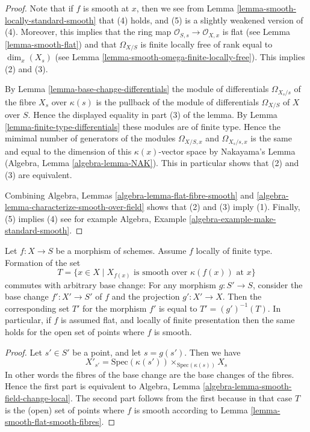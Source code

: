 \begin{proof}
Note that if $f$ is smooth at $x$, then we see from Lemma
\ref{lemma-smooth-locally-standard-smooth} that (4) holds, and (5) is a slightly
weakened version of (4). Moreover, this implies that the ring
map $\mathcal{O}_{S, s} \to \mathcal{O}_{X, x}$ is flat (see
Lemma \ref{lemma-smooth-flat}) and that $\Omega_{X/S}$ is
finite locally free of rank equal to
$\dim_x(X_s)$ (see Lemma \ref{lemma-smooth-omega-finite-locally-free}).
This implies (2) and (3).

\medskip\noindent
By Lemma \ref{lemma-base-change-differentials}
the module of differentials $\Omega_{X_s/s}$ of the fibre $X_s$
over $\kappa(s)$ is the pullback of the module of differentials
$\Omega_{X/S}$ of $X$ over $S$. Hence the displayed equality in
part (3) of the lemma. By Lemma \ref{lemma-finite-type-differentials}
these modules are of finite type. Hence the mimimal number of
generators of the modules
$\Omega_{X/S, x}$ and $\Omega_{X_s/s, x}$ is the same and equal to the
dimension of this $\kappa(x)$-vector space by Nakayama's Lemma
(Algebra, Lemma \ref{algebra-lemma-NAK}). This in particular shows that
(2) and (3) are equivalent.

\medskip\noindent
Combining Algebra, Lemmas \ref{algebra-lemma-flat-fibre-smooth} and
\ref{algebra-lemma-characterize-smooth-over-field} shows that
(2) and (3) imply (1). Finally, (5) implies (4) see for example
Algebra, Example \ref{algebra-example-make-standard-smooth}.
\end{proof}

\begin{lemma}
\label{lemma-set-points-where-fibres-smooth}
Let $f : X \to S$ be a morphism of schemes.
Assume $f$ locally of finite type. Formation of the set
$$
T = \{x \in X \mid
X_{f(x)}\text{ is smooth over }\kappa(f(x))\text{ at }x\}
$$
commutes with arbitrary base change:
For any morphism $g : S' \to S$, consider
the base change $f' : X' \to S'$ of $f$ and the
projection $g' : X' \to X$. Then the corresponding
set $T'$ for the morphism $f'$ is equal to $T' = (g')^{-1}(T)$.
In particular, if $f$ is assumed flat, and locally of finite
presentation then the same holds for the open set of points
where $f$ is smooth.
\end{lemma}

\begin{proof}
Let $s' \in S'$ be a point, and let $s = g(s')$. Then we have
$$
X'_{s'} =
\text{Spec}(\kappa(s')) \times_{\text{Spec}(\kappa(s))} X_s
$$
In other words the fibres of the base change are the base changes
of the fibres. Hence the first part is equivalent to
Algebra, Lemma \ref{algebra-lemma-smooth-field-change-local}.
The second part follows from the first because in that case
$T$ is the (open) set of points where $f$ is smooth according to
Lemma \ref{lemma-smooth-flat-smooth-fibres}.
\end{proof}

